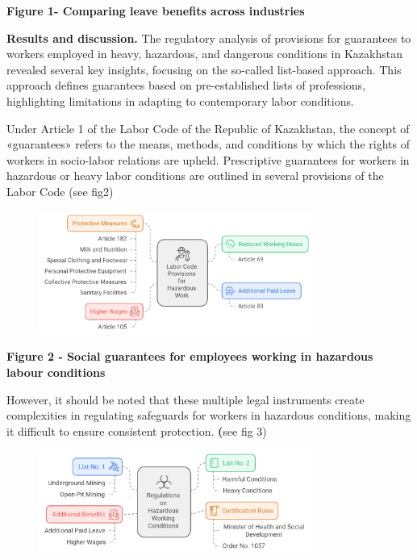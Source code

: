 {\bfseries Figure 1- Comparing leave benefits across industries}

{\bfseries \hfill\break
Results and discussion.} The regulatory analysis of provisions for
guarantees to workers employed in heavy, hazardous, and dangerous
conditions in Kazakhstan revealed several key insights, focusing on the
so-called list-based approach. This approach defines guarantees based on
pre-established lists of professions, highlighting limitations in
adapting to contemporary labor conditions.

Under Article 1 of the Labor Code of the Republic of Kazakhstan, the
concept of «guarantees» refers to the means, methods, and conditions by
which the rights of workers in socio-labor relations are upheld.
Prescriptive guarantees for workers in hazardous or heavy labor
conditions are outlined in several provisions of the Labor Code (see
fig2)

\begin{figure}[H]
	\centering
	\includegraphics[width=0.8\textwidth]{media/gorn/image3}
	\caption*{}
\end{figure}


{\bfseries Figure 2 - Social guarantees for employees working in hazardous
labour conditions}

However, it should be noted that these multiple legal instruments create
complexities in regulating safeguards for workers in hazardous
conditions, making it difficult to ensure consistent protection.
{\bfseries (}see fig 3)

\begin{figure}[H]
	\centering
	\includegraphics[width=0.8\textwidth]{media/gorn/image4}
	\caption*{}
\end{figure}


